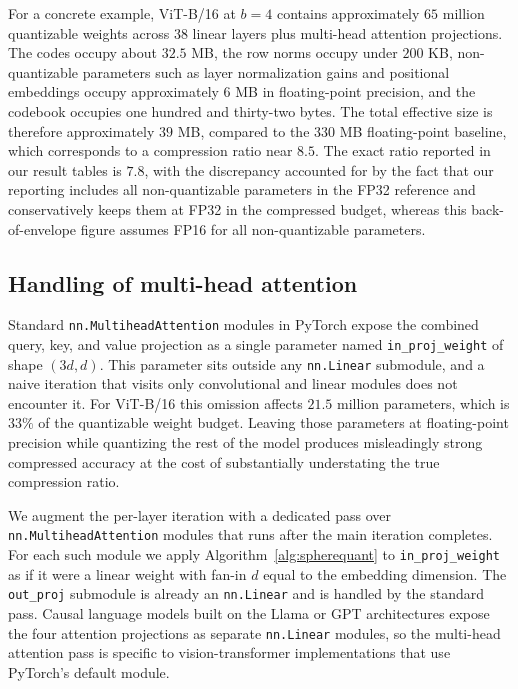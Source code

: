 For a concrete example, ViT-B/16 at $b=4$ contains approximately $65$
million quantizable weights across $38$ linear layers plus multi-head
attention projections. The codes occupy about $32.5$ MB, the row norms
occupy under $200$ KB, non-quantizable parameters such as layer
normalization gains and positional embeddings occupy approximately $6$ MB
in floating-point precision, and the codebook occupies one hundred and
thirty-two bytes. The total effective size is therefore approximately
$39$ MB, compared to the $330$ MB floating-point baseline, which
corresponds to a compression ratio near $8.5$. The exact ratio reported
in our result tables is $7.8$, with the discrepancy accounted for by the
fact that our reporting includes all non-quantizable parameters in the
FP32 reference and conservatively keeps them at FP32 in the compressed
budget, whereas this back-of-envelope figure assumes FP16 for all
non-quantizable parameters.

\subsection{Handling of multi-head attention}
\label{sec:method-mha}

Standard \texttt{nn.MultiheadAttention} modules in PyTorch expose the
combined query, key, and value projection as a single parameter named
\texttt{in\_proj\_weight} of shape $(3d, d)$. This parameter sits outside
any \texttt{nn.Linear} submodule, and a naive iteration that visits only
convolutional and linear modules does not encounter it. For ViT-B/16 this
omission affects $21.5$ million parameters, which is $33\%$ of the
quantizable weight budget. Leaving those parameters at floating-point
precision while quantizing the rest of the model produces misleadingly
strong compressed accuracy at the cost of substantially understating the
true compression ratio.

We augment the per-layer iteration with a dedicated pass over
\texttt{nn.MultiheadAttention} modules that runs after the main iteration
completes. For each such module we apply Algorithm~\ref{alg:spherequant} to
\texttt{in\_proj\_weight} as if it were a linear weight with fan-in $d$
equal to the embedding dimension. The \texttt{out\_proj} submodule is
already an \texttt{nn.Linear} and is handled by the standard pass. Causal
language models built on the Llama or GPT architectures expose the four
attention projections as separate \texttt{nn.Linear} modules, so the
multi-head attention pass is specific to vision-transformer
implementations that use PyTorch's default module.

